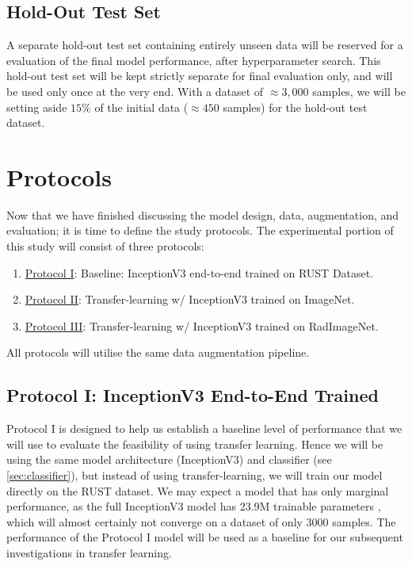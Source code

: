 

\subsection{Hold-Out Test Set}\label{sec:holdout-test-set}
A separate hold-out test set containing entirely unseen data will be reserved for a evaluation of the final model performance, after hyperparameter search. This hold-out test set will be kept strictly separate for final evaluation only, and will be used only once at the very end. With a dataset of \(\approx3,000\) samples, we will be setting aside \(15\%\) of the initial data (\(\approx450\) samples) for the hold-out test dataset.

\clearpage

\section{Protocols}\label{sec:protocols}

Now that we have finished discussing the model design, data, augmentation, and evaluation; it is time to define the study protocols. The experimental portion of this study will consist of three protocols:

\begin{enumerate}
    \item \hyperref[sec:protocol-i-method]{Protocol I}: Baseline: InceptionV3 end-to-end trained on RUST Dataset.
    \item \hyperref[sec:protocol-ii-method]{Protocol II}: Transfer-learning w/ InceptionV3 trained on ImageNet.
    \item \hyperref[sec:protocol-iii-method]{Protocol III}: Transfer-learning w/ InceptionV3 trained on RadImageNet.
\end{enumerate}

\noindent
All protocols will utilise the same data augmentation pipeline.



\subsection{Protocol I: InceptionV3 End-to-End Trained}\label{sec:protocol-i-method}

Protocol I is designed to help us establish a baseline level of performance that we will use to evaluate the feasibility of using transfer learning. Hence we will be using the same model architecture (InceptionV3) and classifier (see \autoref{sec:classifier}), but instead of using transfer-learning, we will train our model directly on the RUST dataset. We may expect a model that has only marginal performance, as the full InceptionV3 model has 23.9M trainable parameters \autocite{inceptionv3}, which will almost certainly not converge on a dataset of only 3000 samples. The performance of the Protocol I model will be used as a baseline for our subsequent investigations in transfer learning.

